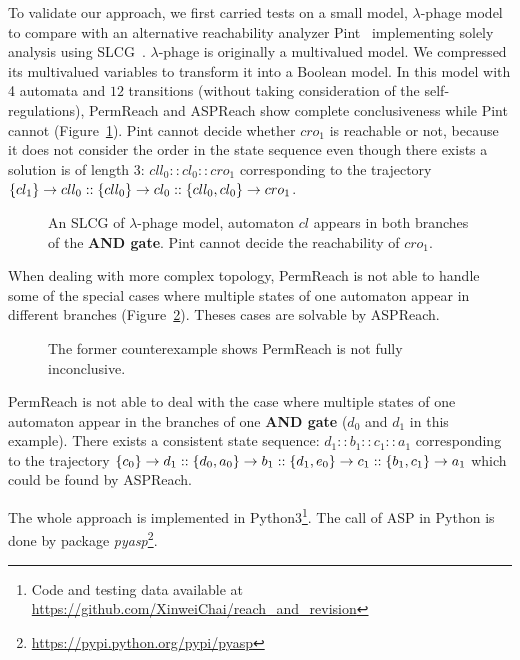 To validate our approach, we first carried tests on a small model, $\lambda$-phage model~\cite{thieffry1995dynamical} to compare with an alternative reachability analyzer Pint~\cite{pauleve2012} implementing solely analysis using SLCG~\cite{pauleve2017reduction,folschette2015,pauleve2011}.
$\lambda$-phage is originally a multivalued model.
We compressed its multivalued variables to transform it into a Boolean model.
In this model with 4 automata and $12$ transitions (without taking consideration of the self-regulations),
PermReach and ASPReach show complete conclusiveness while Pint cannot (Figure~\ref{fig:LCG_lambdaPhage}). %
Pint cannot decide whether $cro_1$ is reachable or not, because it does not consider the order in the state sequence even though there exists a solution is of length 3: $cll_0::cl_0::cro_1$ corresponding to the trajectory $\acm{cl_1}{cll_1}{cll_0}::\acm{cll_0}{cl_1}{cl_0}::\acm{cll_0,cl_0}{cro_0}{cro_1}$.
\begin{figure}[ht]
\centering
    
    \caption[SLCG of $\lambda$-phage model]{An SLCG of $\lambda$-phage model, automaton $cl$ appears in both branches of the \textbf{AND gate}.
    Pint cannot decide the reachability of $cro_1$.}
    \label{fig:LCG_lambdaPhage}
\end{figure}

When dealing with more complex topology, PermReach is not able to handle some of the special cases where multiple states of one automaton appear in different branches (Figure~\ref{fig:countexPerm}).
Theses cases are solvable by ASPReach.

\begin{figure}[ht]
    \centering
    
    \caption[Counterexample of PermReach]{The former counterexample shows PermReach is not fully inconclusive.}\label{fig:countexPerm}
\end{figure}

PermReach is not able to deal with the case where multiple states of one automaton appear in the branches of one \textbf{AND gate} ($d_0$ and $d_1$ in this example).
There exists a consistent state sequence: $d_1::b_1::c_1::a_1$ corresponding to the trajectory $\acm{c_0}{d_0}{d_1}::\acm{d_0,a_0}{b_0}{b_1}::\acm{d_1,e_0}{c_0}{c_1}::\acm{b_1,c_1}{a_0}{a_1}$ which could be found by ASPReach.

The whole approach is implemented in Python3\footnote{Code and testing data available at \url{https://github.com/XinweiChai/reach_and_revision}}.
The call of ASP in Python is done by package \textit{pyasp}\footnote{\url{https://pypi.python.org/pypi/pyasp}}. 

